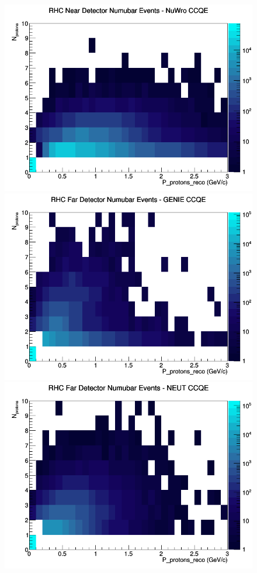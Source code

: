 \documentclass[12pt]{article}
\begin{document}
\begin{figure}[h]
\includegraphics[width=\linewidth]{eff_N_P/FGT/protons/CCQE_RHC_ND_numubar_N_P_NuWro.png}
\endminipage
\newline
{}
\includegraphics[width=\linewidth]{eff_N_P/FGT/protons/CCQE_RHC_FD_numubar_N_P_GENIE.png}
\endminipage
{}
\includegraphics[width=\linewidth]{eff_N_P/FGT/protons/CCQE_RHC_FD_numubar_N_P_NEUT.png}

\end{figure}
\end{document}
